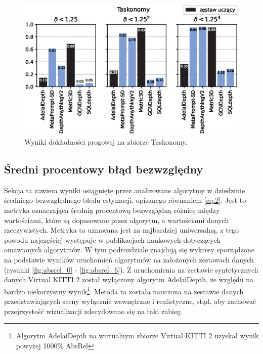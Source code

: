 \begin{figure}[H]
    \centering
    \includegraphics{plots/delta/6}
    \caption{Wyniki dokładności progowej na zbiorze Taskonomy.}
    \label{fig:delta_6}
\end{figure}

\subsection{Średni procentowy błąd bezwzględny}
Sekcja ta zawiera wyniki osiągnięte przez analizowane algorytmy w dziedzinie średniego bezwzględnego błedu estymacji, opisanego równaniem \ref{eq:2}. Jest to metryka oznaczająca średnią procentową bezwzględną różnicę między wartościami, które są dopasowane przez algorytm, a wartościami danych rzeczywistych. Metryka ta uznawana jest za najbardziej uniwersalną, z tego powodu najczęściej występuje w publikacjach naukowych dotyczących omawianych algorytmów. W tym podrozdziale znajdują się wykresy sporządzone na podstawie wyników uruchomień algorytmów na założonych zestawach danych (rysunki \ref{fig:absrel_0} - \ref{fig:absrel_6}). Z uruchomienia na zestawie syntetycznych danych Virtual KITTI 2 został wyłączony algorytm AdelaiDepth, ze względu na bardzo niekorzystny wynik\footnote{Algorytm AdelaiDepth na wirtualnym zbiorze Virtual KITTI 2 uzyskał wynik powyżej 1000\% AbsRel}. Metoda ta została nauczona na zestawie danych przedstawiających sceny wyłącznie wewnętrzne i realistyczne, stąd, aby zachować przejrzystość wizualizacji zdecydowano się na taki zabieg.

